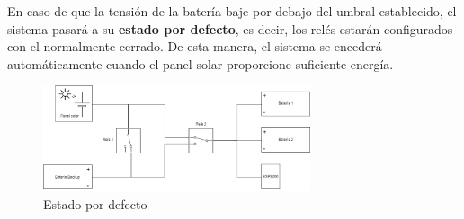 En caso de que la tensión de la batería baje por debajo del umbral establecido, el sistema pasará a su \textbf{estado por defecto}, es decir, los relés estarán configurados con el normalmente cerrado. De esta manera, el sistema se encederá automáticamente cuando el panel solar proporcione suficiente energía.

\begin{figure}[H]
    \centering
    \includegraphics[width=0.7\textwidth]{images/2-hardware/Estado_defecto.png}
    \caption{Estado por defecto}
    \label{fig:hardware/estados/defecto}
\end{figure}
